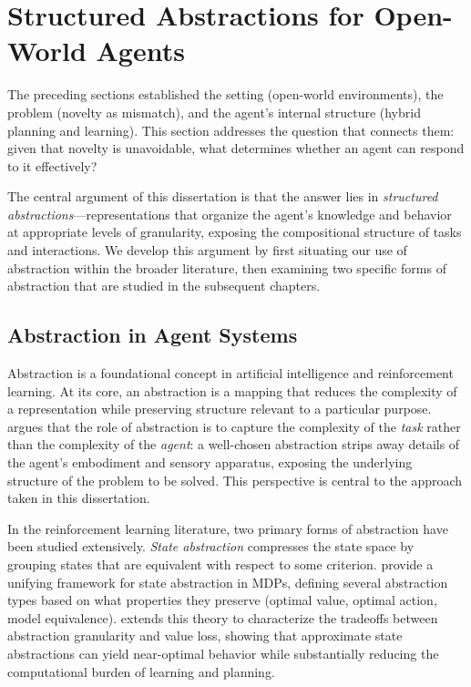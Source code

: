 \section{Structured Abstractions for Open-World Agents}
\label{sec:abstractions}

The preceding sections established the setting (open-world environments), the problem (novelty as mismatch), and the agent's internal structure (hybrid planning and learning). This section addresses the question that connects them: given that novelty is unavoidable, what determines whether an agent can respond to it effectively?

The central argument of this dissertation is that the answer lies in \emph{structured abstractions}---representations that organize the agent's knowledge and behavior at appropriate levels of granularity, exposing the compositional structure of tasks and interactions. We develop this argument by first situating our use of abstraction within the broader literature, then examining two specific forms of abstraction that are studied in the subsequent chapters.

\subsection{Abstraction in Agent Systems}
\label{sec:abstraction_definition}

Abstraction is a foundational concept in artificial intelligence and reinforcement learning. At its core, an abstraction is a mapping that reduces the complexity of a representation while preserving structure relevant to a particular purpose. \citet{konidaris2019necessity} argues that the role of abstraction is to capture the complexity of the \emph{task} rather than the complexity of the \emph{agent}: a well-chosen abstraction strips away details of the agent's embodiment and sensory apparatus, exposing the underlying structure of the problem to be solved. This perspective is central to the approach taken in this dissertation.

In the reinforcement learning literature, two primary forms of abstraction have been studied extensively. \emph{State abstraction} compresses the state space by grouping states that are equivalent with respect to some criterion. \citet{li2006towards} provide a unifying framework for state abstraction in MDPs, defining several abstraction types based on what properties they preserve (optimal value, optimal action, model equivalence). \citet{abel2020theory} extends this theory to characterize the tradeoffs between abstraction granularity and value loss, showing that approximate state abstractions can yield near-optimal behavior while substantially reducing the computational burden of learning and planning.

